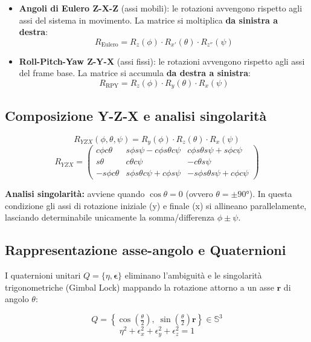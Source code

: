 \documentclass[11pt, a4paper]{article}
\begin{document}
\begin{itemize}[itemsep=4pt]
  \item \textbf{Angoli di Eulero Z-X-Z} (assi mobili): le rotazioni avvengono rispetto agli assi
        del sistema in movimento. La matrice si moltiplica \textbf{da sinistra a destra}:
        \[
          R_{\text{Eulero}} = R_z(\phi)\cdot R_{x'}(\theta)\cdot R_{z''}(\psi)
        \]
  \item \textbf{Roll-Pitch-Yaw Z-Y-X} (assi fissi): le rotazioni avvengono rispetto agli assi del
        frame base. La matrice si accumula \textbf{da destra a sinistra}:
        \[
          R_{\text{RPY}} = R_z(\phi)\cdot R_y(\theta)\cdot R_x(\psi)
        \]
\end{itemize}

\subsection{Composizione Y-Z-X e analisi singolarità}

\begin{formulabox}
\[
R_{YZX}(\phi,\theta,\psi) = R_y(\phi)\cdot R_z(\theta)\cdot R_x(\psi)
\]
\[
R_{YZX} =
\begin{pmatrix}
 c\phi c\theta &  s\phi s\psi - c\phi s\theta c\psi &  c\phi s\theta s\psi + s\phi c\psi \\
 s\theta       &  c\theta c\psi                      & -c\theta s\psi                     \\
-s\phi c\theta &  s\phi s\theta c\psi + c\phi s\psi  & -s\phi s\theta s\psi + c\phi c\psi
\end{pmatrix}
\]
\end{formulabox}

\textbf{Analisi singolarità:} avviene quando $\cos\theta = 0$ (ovvero $\theta = \pm90°$).
In questa condizione gli assi di rotazione iniziale (y) e finale (x) si allineano
parallelamente, lasciando determinabile unicamente la somma/differenza $\phi \pm \psi$.

\subsection{Rappresentazione asse-angolo e Quaternioni}

I quaternioni unitari $Q = \{\eta, \boldsymbol{\epsilon}\}$ eliminano l'ambiguità e le singolarità
trigonometriche (Gimbal Lock) mappando la rotazione attorno a un asse $\mathbf{r}$ di angolo $\theta$:
\begin{formulabox}
\[
Q = \left\{ \cos\!\left(\tfrac{\theta}{2}\right),\; \sin\!\left(\tfrac{\theta}{2}\right)\mathbf{r} \right\}
  \in \mathbb{S}^3
\]
\[
\eta^2 + \epsilon_x^2 + \epsilon_y^2 + \epsilon_z^2 = 1
\]
\end{formulabox}
\end{document}
